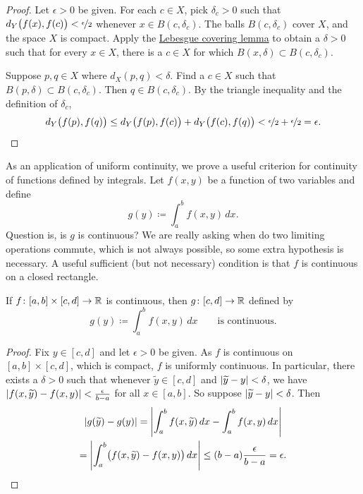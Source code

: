 \begin{proof}
Let $\epsilon > 0$ be given.  For each $c \in X$, pick $\delta_c > 0$ such that
$d_Y\bigl(f(x),f(c)\bigr) < \nicefrac{\epsilon}{2}$
whenever
$x \in B(c,\delta_c)$.
The balls
$B(c,\delta_c)$ cover $X$, and the space $X$ is compact.  
Apply the \hyperref[ms:lebesgue]{Lebesgue covering lemma} to obtain a 
$\delta > 0$ such that for every $x \in X$, there is a $c \in X$
for which $B(x,\delta) \subset B(c,\delta_c)$.

Suppose $p, q \in X$ where $d_X(p,q) < \delta$.
Find a $c \in X$ such that $B(p,\delta) \subset B(c,\delta_c)$.
Then $q \in B(c,\delta_c)$.  By the triangle inequality
and the definition of $\delta_c$,
\begin{equation*}
d_Y\bigl(f(p),f(q)\bigr)
\leq
d_Y\bigl(f(p),f(c)\bigr)
+
d_Y\bigl(f(c),f(q)\bigr)
<
\nicefrac{\epsilon}{2}+
\nicefrac{\epsilon}{2} = \epsilon .  \qedhere
\end{equation*}
\end{proof}

As an application of uniform continuity,
we prove a useful criterion for
continuity of functions defined by integrals.
Let $f(x,y)$ be a function of two variables and define
\begin{equation*}
g(y) \coloneqq \int_a^b f(x,y) \,dx .
\end{equation*}
Question is, is $g$ is continuous?
We are really asking when do two limiting operations commute,
which is not always possible, so some extra hypothesis
is necessary.  A useful sufficient (but not
necessary) condition is that $f$ is continuous on a closed rectangle.

\begin{prop} \label{prop:integralcontcont}
If $f \colon [a,b] \times [c,d] \to {\mathbb{R}}$ is continuous,
then $g \colon [c,d] \to {\mathbb{R}}$ defined by
\begin{equation*}
g(y) \coloneqq \int_a^b f(x,y) \,dx  \qquad \text{is continuous}.
\end{equation*}
\end{prop}

\begin{proof}
Fix $y \in [c,d]$ and
let $\epsilon > 0$ be given.
As $f$ is continuous on $[a,b] \times [c,d]$, which is compact, $f$
is uniformly continuous.  
In particular, there exists a $\delta > 0$ such that
whenever $\widetilde{y} \in [c,d]$ and
$\left\lvert {\widetilde{y}-y} \right\rvert < \delta$, we have
$\left\lvert {f(x,\widetilde{y})-f(x,y)} \right\rvert < \frac{\epsilon}{b-a}$ for all $x \in [a,b]$.
So suppose $\left\lvert {\widetilde{y}-y} \right\rvert < \delta$.  Then
\begin{multline*}
\left\lvert {
g(\widetilde{y})-
g(y)
} \right\rvert
=
\left\lvert {
\int_a^b 
f(x,\widetilde{y}) \,dx 
-
\int_a^b 
f(x,y) \,dx 
} \right\rvert
\\
=
\left\lvert {
\int_a^b 
\bigl(
f(x,\widetilde{y}) - f(x,y)
\bigr)
\,dx 
} \right\rvert
\leq
(b-a)
\frac{\epsilon}{b-a}
= \epsilon . \qedhere
\end{multline*}
\end{proof}

